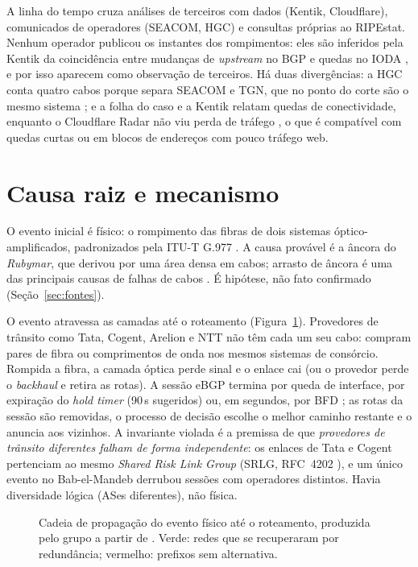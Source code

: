 \documentclass[12pt]{article}
\begin{document}
A linha do tempo cruza análises de terceiros com dados (Kentik, Cloudflare), comunicados
de operadores (SEACOM, HGC) e consultas próprias ao RIPEstat. Nenhum operador publicou os
instantes dos rompimentos: eles são inferidos pela Kentik da coincidência entre mudanças
de \textit{upstream} no BGP e quedas no IODA \cite{madory2024}, e por isso aparecem como
observação de terceiros. Há duas divergências: a HGC conta quatro cabos porque separa
SEACOM e TGN, que no ponto do corte são o mesmo sistema \cite{telegeography2026}; e a folha
do caso e a Kentik relatam quedas de conectividade, enquanto o Cloudflare Radar não viu
perda de tráfego \cite{belson2024}, o que é compatível com quedas curtas ou em blocos de
endereços com pouco tráfego web.

\section{Causa raiz e mecanismo}

O evento inicial é físico: o rompimento das fibras de dois sistemas óptico-amplificados,
padronizados pela ITU-T G.977 \cite{itug977}. A causa provável é a âncora do
\textit{Rubymar}, que derivou por uma área densa em cabos; arrasto de âncora é uma das
principais causas de falhas de cabos \cite{madory2024,icpc2024}. É hipótese, não fato
confirmado (Seção~\ref{sec:fontes}).

O evento atravessa as camadas até o roteamento (Figura~\ref{fig:mecanismo}). Provedores de
trânsito como Tata, Cogent, Arelion e NTT não têm cada um seu cabo: compram pares de fibra
ou comprimentos de onda nos mesmos sistemas de consórcio. Rompida a fibra, a camada óptica
perde sinal e o enlace cai (ou o provedor perde o \textit{backhaul} e retira as rotas). A
sessão eBGP termina por queda de interface, por expiração do \textit{hold timer} (90\,s
sugeridos) ou, em segundos, por BFD \cite{rfc4271,rfc5880}; as rotas da sessão são
removidas, o processo de decisão \cite[§9.1]{rfc4271} escolhe o melhor caminho restante e
o anuncia aos vizinhos. A invariante violada é a premissa de que \emph{provedores de
trânsito diferentes falham de forma independente}: os enlaces de Tata e Cogent pertenciam
ao mesmo \textit{Shared Risk Link Group} (SRLG, RFC~4202 \cite{rfc4202}), e um único evento
no Bab-el-Mandeb derrubou sessões com operadores distintos. Havia diversidade lógica (ASes
diferentes), não física.

\begin{figure}[t]
\centering
\resizebox{\textwidth}{!}{}
\caption{Cadeia de propagação do evento físico até o roteamento, produzida pelo grupo a partir de \cite{madory2024,telegeography2026}. Verde: redes que se recuperaram por redundância; vermelho: prefixos sem alternativa.}
\label{fig:mecanismo}
\end{figure}
\end{document}
